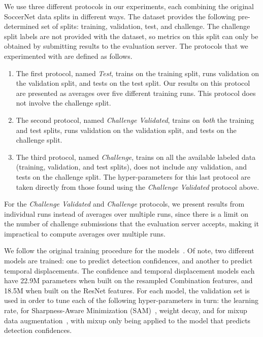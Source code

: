 \documentclass[10pt,twocolumn,letterpaper]{article}
\begin{document}
We use three different protocols in our experiments, each combining the original SoccerNet data splits in different ways. The dataset provides the following pre-determined set of splits: training, validation, test, and challenge. The challenge split labels are not provided with the dataset, so metrics on this split can only be obtained by submitting results to the evaluation server. The protocols that we experimented with are defined as follows. \begin{enumerate}
    \item The first protocol, named {\it Test}, trains on the training split, runs validation on the validation split, and tests on the test split. Our results on this protocol are presented as averages over five different training runs. This protocol does not involve the challenge split.
    \item The second protocol, named {\it Challenge Validated}, trains on {\it both} the training and test splits, runs validation on the validation split, and tests on the challenge split.
    \item The third protocol, named {\it Challenge}, trains on all the available labeled data (training, validation, and test splits), does not include any validation, and tests on the challenge split. The hyper-parameters for this last protocol are taken directly from those found using the {\it Challenge Validated} protocol above.
\end{enumerate}
For the {\it Challenge Validated} and {\it Challenge} protocols, we present results from individual runs instead of averages over multiple runs, since there is a limit on the number of challenge submissions that the evaluation server accepts, making it impractical to compute averages over multiple runs.

We follow the original training procedure for the models~\cite{soares2022temporally}. Of note, two different models are trained: one to predict detection confidences, and another to predict temporal displacements. 
The confidence and temporal displacement models each have 22.9M parameters when built on the resampled Combination features, and 18.5M when built on the ResNet features. For each model, the validation set is used in order to tune each of the following hyper-parameters in turn: the learning rate,  for Sharpness-Aware Minimization (SAM)~\cite{foret2021sharpnessaware}, weight decay, and  for mixup data augmentation~\cite{zhang2018mixup}, with mixup only being applied to the model that predicts detection confidences.
\end{document}
